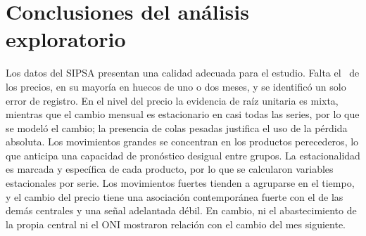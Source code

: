\FloatBarrier
\section{Conclusiones del análisis exploratorio}
\label{sec:conclusiones_eda}

Los datos del SIPSA presentan una calidad adecuada para el estudio. Falta el \cfaltserie\pct\ de los precios, en su mayoría en huecos de uno o dos meses, y se identificó un solo error de registro. En el nivel del precio la evidencia de raíz unitaria es mixta, mientras que el cambio mensual es estacionario en casi todas las series, por lo que se modeló el cambio; la presencia de colas pesadas justifica el uso de la pérdida absoluta. Los movimientos grandes se concentran en los productos perecederos, lo que anticipa una capacidad de pronóstico desigual entre grupos. La estacionalidad es marcada y específica de cada producto, por lo que se calcularon variables estacionales por serie. Los movimientos fuertes tienden a agruparse en el tiempo, y el cambio del precio tiene una asociación contemporánea fuerte con el de las demás centrales y una señal adelantada débil. En cambio, ni el abastecimiento de la propia central ni el ONI mostraron relación con el cambio del mes siguiente.

\FloatBarrier
